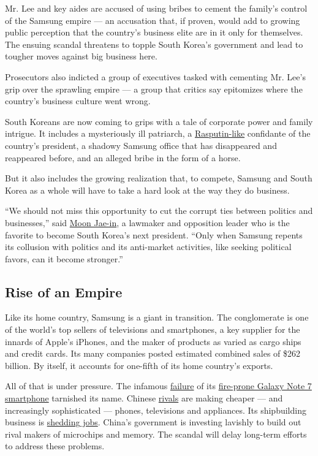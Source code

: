 Mr. Lee and key aides are accused of using bribes to cement the family's
control of the Samsung empire --- an accusation that, if proven, would
add to growing public perception that the country's business elite are
in it only for themselves. The ensuing scandal threatens to topple South
Korea's government and lead to tougher moves against big business here.

Prosecutors also indicted a group of executives tasked with cementing
Mr. Lee's grip over the sprawling empire --- a group that critics say
epitomizes where the country's business culture went wrong.

South Koreans are now coming to grips with a tale of corporate power and
family intrigue. It includes a mysteriously ill patriarch, a
\href{https://www.nytimes3xbfgragh.onion/2016/11/01/world/asia/south-korea-park-geun-hye-choi-soon-sil.html}{Rasputin-like}
confidante of the country's president, a shadowy Samsung office that has
disappeared and reappeared before, and an alleged bribe in the form of a
horse.

But it also includes the growing realization that, to compete, Samsung
and South Korea as a whole will have to take a hard look at the way they
do business.

``We should not miss this opportunity to cut the corrupt ties between
politics and businesses,'' said
\href{https://www.nytimes3xbfgragh.onion/2016/12/09/world/asia/south-korea-who-could-replace-park.html}{Moon
Jae-in}, a lawmaker and opposition leader who is the favorite to become
South Korea's next president. ``Only when Samsung repents its collusion
with politics and its anti-market activities, like seeking political
favors, can it become stronger.''

\hypertarget{rise-of-an-empire}{%
\subsection{Rise of an Empire}\label{rise-of-an-empire}}

Like its home country, Samsung is a giant in transition. The
conglomerate is one of the world's top sellers of televisions and
smartphones, a key supplier for the innards of Apple's iPhones, and the
maker of products as varied as cargo ships and credit cards. Its many
companies posted estimated combined sales of \$262 billion. By itself,
it accounts for one-fifth of its home country's exports.

All of that is under pressure. The infamous
\href{https://www.nytimes3xbfgragh.onion/2016/10/12/business/international/samsung-galaxy-note7-terminated.html}{failure}
of its
\href{https://www.nytimes3xbfgragh.onion/2017/01/23/business/samsung-galaxy-note7-fires.html}{fire-prone
Galaxy Note 7 smartphone} tarnished its name. Chinese
\href{https://www.nytimes3xbfgragh.onion/2016/10/19/business/samsung-galaxy-note7-china-test.html}{rivals}
are making cheaper --- and increasingly sophisticated --- phones,
televisions and appliances. Its shipbuilding business is
\href{http://english.yonhapnews.co.kr/news/2017/01/12/0200000000AEN20170112002500320.html}{shedding
jobs}. China's government is investing lavishly to build out rival
makers of microchips and memory. The scandal will delay long-term
efforts to address these problems.

